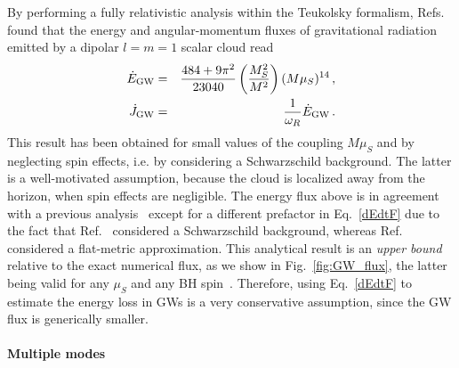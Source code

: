 \documentclass[11pt]{article}
\numberwithin{equation}{section} %
\begin{document}
By performing a fully relativistic analysis within the Teukolsky formalism, Refs.~\cite{Brito:2014wla,Brito:2017zvb} found that the energy and angular-momentum fluxes of gravitational radiation emitted by a dipolar $l=m=1$ scalar cloud read
%
\begin{eqnarray}
 \dot{E}_{\rm GW}&=&\frac{484+9 \pi ^2}{23040}\left(\frac{M_S^2}{M^2}\right)(M\mu_S)^{14}\,, \label{dEdtF}\\
 \dot{J}_{\rm GW}&=&\frac{1}{\omega_R} \dot{E}_{\rm GW}\,. \label{dJdtF}
\end{eqnarray}
%
This result has been obtained for small values of the coupling $M\mu_S$ and by neglecting spin effects, i.e. by considering a Schwarzschild background. The latter is a well-motivated assumption, because the cloud is localized away from the horizon, when spin effects are negligible. The energy flux above is in agreement with a previous analysis~\cite{Yoshino:2013ofa} except for a different prefactor in Eq.~\eqref{dEdtF} due to the fact that Ref.~\cite{Brito:2014wla} considered a Schwarzschild background, whereas Ref.~\cite{Yoshino:2013ofa} considered a flat-metric approximation. This analytical result is an \emph{upper bound} relative to the exact numerical flux, as we show in Fig.~\eqref{fig:GW_flux}, the latter being valid for any $\mu_S$ and any BH spin~\cite{Yoshino:2013ofa}. Therefore, using Eq.~\eqref{dEdtF} to estimate the energy loss in GWs is a very conservative assumption, since the GW flux is generically smaller. 


\paragraph{Multiple modes}
\end{document}
